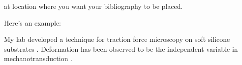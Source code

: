 \documentclass[titlepage,12pt]{article}
\begin{document}
at location where you want your bibliography to be placed.

Here's an example:

My lab developed a technique for traction force microscopy on soft silicone substrates \cite{Yoshie:2018aa}. Deformation has been observed to be the independent variable in mechanotransduction \cite{Tajik_2016,Ehrlicher_2015}.



\end{document}
